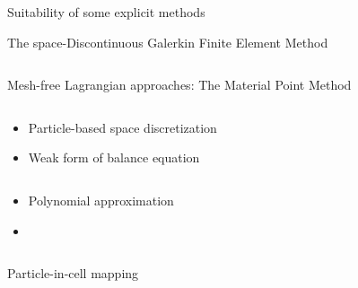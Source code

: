 \begin{withoutheadline}
\begin{frame}{Suitability of some explicit methods}
\begin{block}{The space-Discontinuous Galerkin Finite Element Method \cite{Cockburn}}
\begin{overprint}
\begin{columns}
\begin{column}{0.48\textwidth}
          \end{column}
        \end{columns}
        \vspace{-0.2cm}
      \end{overprint}
    \end{block}
  \end{frame}
\end{withoutheadline}



\begin{withoutheadline}
  \begin{frame}{Mesh-free Lagrangian approaches: The Material Point Method \cite{Sulsky94}}
    \nocite{Sulsky94}
    \begin{columns}
      \begin{footnotesize}
        \begin{column}{0.4\textwidth}
          \begin{itemize}
          \item[] Particle-based space discretization
          \item[] Weak form of balance equation
          \end{itemize}
        \end{column}
        \begin{column}{0.6\textwidth}
          \begin{itemize}
          \item[] Polynomial approximation
          \item[] %
          \end{itemize}
        \end{column}
      \end{footnotesize}
    \end{columns}
    \vspace{-0.2cm}
    \begin{columns}
      \begin{column}{0.48\textwidth}
        \begin{block}{\footnotesize Particle-in-cell mapping \cite{PIC}}
\end{block}
\end{column}
\end{columns}
\end{frame}
\end{withoutheadline}
